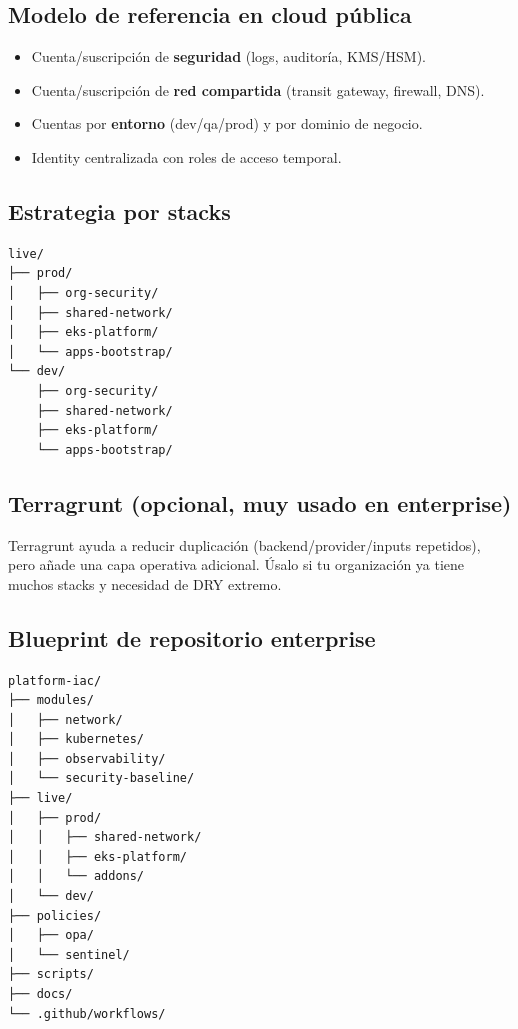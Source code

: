 \documentclass[12pt,a4paper]{article}
\begin{document}
\subsection{Modelo de referencia en cloud pública}
\begin{itemize}
		\item Cuenta/suscripción de \textbf{seguridad} (logs, auditoría, KMS/HSM).
		\item Cuenta/suscripción de \textbf{red compartida} (transit gateway, firewall, DNS).
		\item Cuentas por \textbf{entorno} (dev/qa/prod) y por dominio de negocio.
		\item Identity centralizada con roles de acceso temporal.
\end{itemize}

\subsection{Estrategia por stacks}
\begin{lstlisting}[caption=Separación por stacks y estados]
live/
├── prod/
│   ├── org-security/
│   ├── shared-network/
│   ├── eks-platform/
│   └── apps-bootstrap/
└── dev/
    ├── org-security/
    ├── shared-network/
    ├── eks-platform/
    └── apps-bootstrap/
\end{lstlisting}

\subsection{Terragrunt (opcional, muy usado en enterprise)}
Terragrunt ayuda a reducir duplicación (backend/provider/inputs repetidos), pero añade una capa operativa adicional. Úsalo si tu organización ya tiene muchos stacks y necesidad de DRY extremo.

\subsection{Blueprint de repositorio enterprise}
\begin{lstlisting}[caption=Estructura recomendada para equipos grandes]
platform-iac/
├── modules/
│   ├── network/
│   ├── kubernetes/
│   ├── observability/
│   └── security-baseline/
├── live/
│   ├── prod/
│   │   ├── shared-network/
│   │   ├── eks-platform/
│   │   └── addons/
│   └── dev/
├── policies/
│   ├── opa/
│   └── sentinel/
├── scripts/
├── docs/
└── .github/workflows/
\end{lstlisting}
\end{document}
